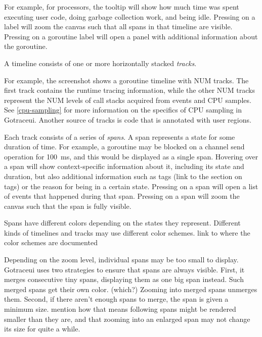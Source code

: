 \documentclass[10pt,letterpaper,oneside,openany,showtrims]{memoir}
\newcommand{\noun}[1]{{\emph{#1}}}
\newcommand{\todo}[1]{{\color{red}#1}}
\newcommand{\shortcut}{\ctrl{} or \cmdmac}
\begin{document}

For example, for processors, the tooltip will show how much time was spent executing user code,
doing garbage collection work,
and being idle.
Pressing \keys{\shortcut+LMB} on a label will zoom the canvas such that all spans in that timeline are visible.
Pressing  on a goroutine label will open a panel with additional information about the goroutine.

A timeline consists of one or more horizontally stacked \noun{tracks}.


For example, the screenshot shows a goroutine timeline with \todo{NUM} tracks.
The first track contains the runtime tracing information,
while the other \todo{NUM} tracks represent the \todo{NUM} levels of call stacks acquired from events and CPU samples.
See \autoref{cpu-sampling} for more information on the specifics of CPU sampling in Gotraceui.
Another source of tracks is code that is annotated with user regions.

Each track consists of a series of \noun{spans}.
A span represents a state for some duration of time.
For example, a goroutine may be blocked on a channel send operation for \unit{100 ms}, and this would be displayed as a single span.
Hovering over a span will show context-specific information about it,
including its state and duration,
but also additional information such as tags
\todo{(link to the section on tags})
or the reason for being in a certain state.
Pressing  on a span will open a list of events that happened during that span.
Pressing \keys{\shortcut+LMB} on a span will zoom the canvas such that the span is fully visible.

Spans have different colors depending on the states they represent.
Different kinds of timelines and tracks may use different color schemes.
\todo{link to where the color schemes are documented}

Depending on the zoom level, individual spans may be too small to display.
Gotraceui uses two strategies to ensure that spans are always visible.
First, it merges consecutive tiny spans, displaying them as one big span instead.
Such merged spans get their own color.
\todo{(which?)}
Zooming into merged spans unmerges them.
Second, if there aren't enough spans to merge, the span is given a minimum size.
\todo{mention how that means following spans might be rendered smaller than they are,
and that zooming into an enlarged span may not change its size for quite a while.}
\end{document}
